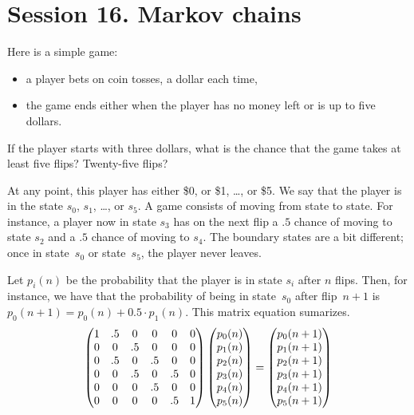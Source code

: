 \section{Session 16. Markov chains}

\begin{Exercise}
    Here is a simple game:
\begin{itemize}
    \item a player bets on coin tosses, a dollar each time,
    \item the game ends either when the player has no money left
    or is up to five dollars.
\end{itemize}
If the player starts with three dollars, what is the chance that the game
    takes at least five flips?
    Twenty-five flips?
\end{Exercise}

At any point, this player has either \$0, or \$1, \ldots, or \$5.
We say that the player is in the
state
$s_0$, $s_1$, \ldots, or $s_5$.
A game consists of moving from state to state.
For instance,
a player now in state $s_3$ has on the next flip a $.5$ chance of moving
to state $s_2$ and a $.5$ chance of moving to $s_4$.
The boundary states are a bit different;
once in state~$s_0$ or state~$s_5$,
the player never leaves.



Let $p_{i}(n)$ be the probability that the player is in state $s_i$
after $n$ flips.
Then, for instance, we have that the probability of being in state~$s_0$
after flip~$n+1$ is
$p_{0}(n+1)=p_{0}(n)+0.5\cdot p_{1}(n)$.
This matrix equation sumarizes.
\begin{equation*}
  \begin{pmatrix}
      1  &.5 &0  &0  &0   &0  \\
      0  &0  &.5 &0  &0   &0  \\
      0  &.5 &0  &.5 &0   &0  \\
      0  &0  &.5 &0  &.5  &0  \\
      0  &0  &0  &.5 &0   &0  \\
      0  &0  &0  &0  &.5  &1
   \end{pmatrix}
   \begin{pmatrix} p_{0}(n) \\
        p_{1}(n) \\
        p_{2}(n) \\
        p_{3}(n) \\
        p_{4}(n) \\
        p_{5}(n) \end{pmatrix}
   =\begin{pmatrix} p_{0}(n+1) \\
        p_{1}(n+1) \\
        p_{2}(n+1) \\
        p_{3}(n+1) \\
        p_{4}(n+1) \\
        p_{5}(n+1) \end{pmatrix}
\end{equation*}

